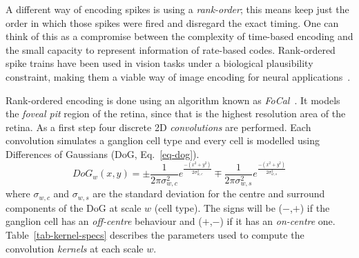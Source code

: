A different way of encoding spikes is using a \emph{rank-order}; this means
keep just the order in which those spikes were fired and disregard the exact timing. One can think of this as a compromise between the complexity of time-based encoding and the small capacity to represent information of rate-based codes. Rank-ordered spike trains have been used in vision tasks under a biological plausibility constraint, making them a viable way of image encoding for neural applications~\cite{van-rullen-rate-coding,basab-model}.

Rank-ordered encoding is done using an algorithm known as 
\emph{FoCal}~\cite{basab-model}. It models the \emph{foveal pit} region of the 
retina, since that is the highest resolution area of the retina. As a first step four discrete 2D \emph{convolutions} are performed. Each convolution simulates a ganglion cell type and every cell is modelled using Differences of Gaussians (DoG, Eq.~\ref{eq-dog}). 
\begin{equation}
\label{eq-dog}
DoG_w(x,y) = \pm\frac{1}{2\pi\sigma_{w,c}^2}e^{\frac{-(x^2 + y^2)}{2\sigma_{w,c}^2}}
\mp\frac{1}{2\pi\sigma_{w,s}^2}e^{\frac{-(x^2 + y^2)}{2\sigma_{w,s}^2}}
\end{equation}
where $\sigma_{w,c}$ and $\sigma_{w,s}$ are the standard deviation for the 
centre and surround components of the DoG at scale $w$ (cell type). The signs 
will be ($-$,$+$) if the ganglion cell has an \emph{off-centre} behaviour and 
($+$,$-$) if it has an \emph{on-centre} one. Table~\ref{tab-kernel-specs} 
describes the parameters used to compute the convolution \emph{kernels} at each 
scale $w$.

